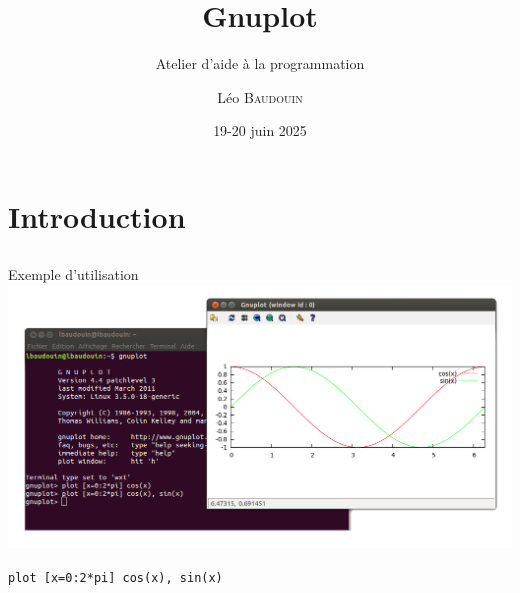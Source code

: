\documentclass{beamer}
\title{Gnuplot}
\subtitle{Atelier d'aide à la programmation}
\author{L\'eo \textsc{Baudouin}}
\institute{
  {\url{baudouin.leo @ gmail.com}}
}
\date{19-20 juin 2025}
\begin{document}
\begin{frame}
  \titlepage
\end{frame}

\section{Introduction}
\subsection{}

\begin{frame}{Exemple d'utilisation}
\includegraphics[width=\linewidth]{images/gnuplot-exemple}

\begin{center}
\verb?plot [x=0:2*pi] cos(x), sin(x)?
\end{center}
\end{frame}
\end{document}
